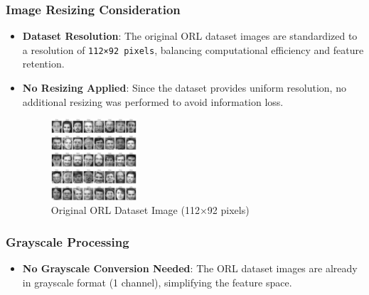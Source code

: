 \documentclass{article}
\begin{document}
	\subsubsection{Image Resizing Consideration}
	\begin{itemize}
		\item \textbf{Dataset Resolution}: The original ORL dataset images are standardized to a resolution of \texttt{112×92 pixels}, balancing computational efficiency and feature retention.
		\item \textbf{No Resizing Applied}: Since the dataset provides uniform resolution, no additional resizing was performed to avoid information loss.
		\begin{figure}[h]
			\centering
 			\includegraphics[width=0.3\textwidth]{Resizing_Orginal.png}
			\caption{Original ORL Dataset Image (112×92 pixels)}
			\label{fig:resizing_original}
		\end{figure}
	\end{itemize}
	
	\subsubsection{Grayscale Processing}
	\begin{itemize}
		\item \textbf{No Grayscale Conversion Needed}: The ORL dataset images are already in grayscale format (1 channel), simplifying the feature space.
	\end{itemize}
	
\end{document}
